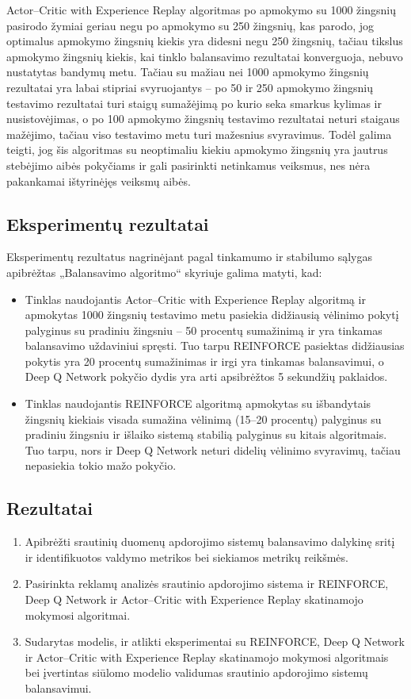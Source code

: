 \documentclass{VUMIFPSbakalaurinis}
\begin{document}
Actor–Critic with Experience Replay algoritmas po apmokymo su 1000 žingsnių pasirodo žymiai geriau negu po apmokymo su 250 žingsnių, kas parodo, jog optimalus apmokymo žingsnių kiekis yra didesni negu 250 žingsnių, tačiau tikslus apmokymo žingsnių kiekis, kai tinklo balansavimo rezultatai konverguoja, nebuvo nustatytas bandymų metu. Tačiau su mažiau nei 1000 apmokymo žingsnių rezultatai yra labai stipriai svyruojantys – po 50 ir 250 apmokymo žingsnių testavimo rezultatai turi staigų sumažėjimą po kurio seka smarkus kylimas ir nusistovėjimas, o po 100 apmokymo žingsnių testavimo rezultatai neturi staigaus mažėjimo, tačiau viso testavimo metu turi mažesnius svyravimus. Todėl galima teigti, jog šis algoritmas su neoptimaliu kiekiu apmokymo žingsnių yra jautrus stebėjimo aibės pokyčiams ir gali pasirinkti netinkamus veiksmus, nes nėra pakankamai ištyrinėjęs veiksmų aibės.

\subsection{Eksperimentų rezultatai}

Eksperimentų rezultatus nagrinėjant pagal tinkamumo ir stabilumo sąlygas apibrėžtas „Balansavimo algoritmo“ skyriuje galima matyti, kad:
\begin{itemize}
    \item Tinklas naudojantis Actor–Critic with Experience Replay algoritmą ir apmokytas 1000 žingsnių testavimo metu pasiekia didžiausią vėlinimo pokytį palyginus su pradiniu žingsniu – 50 procentų sumažinimą ir yra tinkamas balansavimo uždaviniui spręsti. Tuo tarpu REINFORCE pasiektas didžiausias pokytis yra 20 procentų sumažinimas ir irgi yra tinkamas balansavimui, o Deep Q Network pokyčio dydis yra arti apsibrėžtos 5 sekundžių paklaidos. 
    \item Tinklas naudojantis REINFORCE algoritmą apmokytas su išbandytais žingsnių kiekiais visada sumažina vėlinimą (15–20 procentų) palyginus su pradiniu žingsniu ir išlaiko sistemą stabilią palyginus su kitais algoritmais. Tuo tarpu, nors ir Deep Q Network neturi didelių vėlinimo svyravimų, tačiau nepasiekia tokio mažo pokyčio.
\end{itemize}
\subsection*{Rezultatai}
\begin{enumerate}
    \item Apibrėžti srautinių duomenų apdorojimo sistemų balansavimo dalykinę sritį ir identifikuotos valdymo metrikos bei siekiamos metrikų reikšmės.
    \item Pasirinkta reklamų analizės srautinio apdorojimo sistema ir REINFORCE, Deep Q Network ir Actor–Critic with Experience Replay skatinamojo mokymosi algoritmai.
    \item Sudarytas modelis, ir atlikti eksperimentai su REINFORCE, Deep Q Network ir Actor–Critic with Experience Replay skatinamojo mokymosi algoritmais bei įvertintas siūlomo modelio validumas srautinio apdorojimo sistemų balansavimui.
\end{enumerate}
\end{document}

